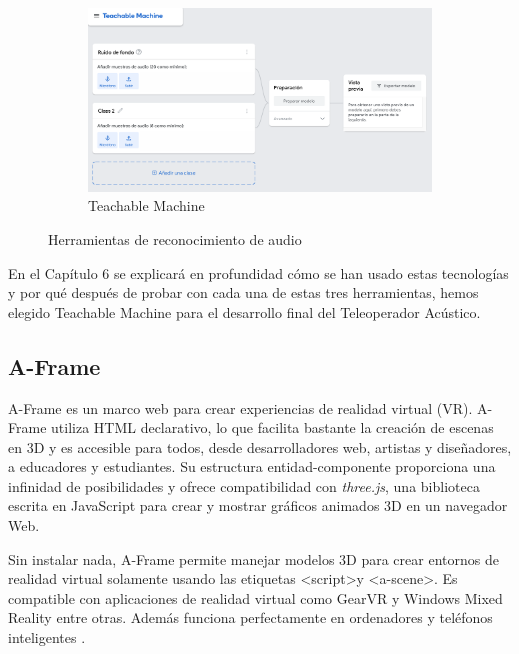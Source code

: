 \begin{figure}[H]
\begin{subfigure}{.3\linewidth}
       \includegraphics[width=1\textwidth, height=0.7\textwidth]{chapters/images/tm.png}
        \caption{Teachable Machine}
    \end{subfigure}
    \caption{Herramientas de reconocimiento de audio}
\end{figure}


En el Capítulo 6 se explicará en profundidad cómo se han usado estas tecnologías y por qué después de probar con cada una de estas tres herramientas, hemos elegido Teachable Machine para el desarrollo final del Teleoperador Acústico.


\subsection{A-Frame}

A-Frame es un marco web para crear experiencias de realidad virtual (VR). A-Frame utiliza HTML declarativo, lo que facilita bastante la creación de escenas en 3D y es accesible para todos, desde desarrolladores web, artistas y diseñadores, a educadores y estudiantes. Su estructura entidad-componente proporciona una infinidad de posibilidades y ofrece compatibilidad con \textit{three.js}, una biblioteca  escrita en JavaScript para crear y mostrar gráficos animados 3D en un navegador Web. 

Sin instalar nada, A-Frame permite manejar modelos 3D para crear entornos de realidad virtual solamente usando las etiquetas \textless script\textgreater  y \textless a-scene\textgreater. Es compatible con aplicaciones de realidad virtual como GearVR y Windows Mixed Reality entre otras. Además funciona perfectamente en ordenadores y teléfonos inteligentes \cite{aframe}. 


